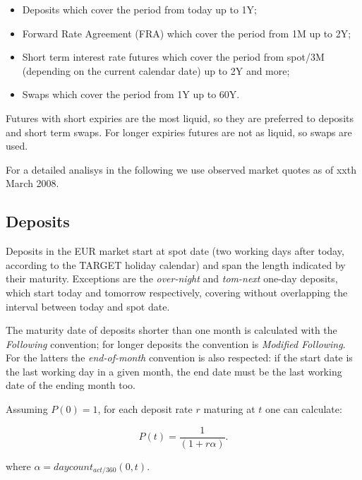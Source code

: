 \documentclass[11pt,reqno]{amsart}
\begin{document}
\begin{itemize}
\item Deposits which cover the period from today up to 1Y;

\item Forward Rate Agreement (FRA) which cover the period from 1M up to 2Y;

\item Short term interest rate futures which cover the period from spot/3M (depending on
the current calendar date) up to 2Y and more;

\item Swaps which cover the period from 1Y up to 60Y.
\end{itemize}

Futures with short expiries are the most liquid, so they are preferred to
deposits and short term swaps. For longer expiries futures are not as liquid, so
swaps are used.

For a detailed analisys in the following we use observed market quotes as of
xxth March 2008.

\subsection{Deposits}

Deposits in the EUR market start at spot date (two working days after today,
according to the TARGET holiday calendar) and span the length indicated by their maturity.
Exceptions are the {\it over-night} and {\it tom-next} one-day deposits, which start today and
tomorrow respectively, covering without overlapping the interval between today and spot date.

The maturity date of deposits shorter than one month is calculated with the
{\it Following} convention; for longer deposits the convention
is {\it Modified Following}. For the latters the {\it end-of-month} convention
is also respected: if the start date is the last working day in a given month,
the end date must be the last working date of the ending month too.

Assuming $P(0)=1$, for each deposit rate $r$ maturing at $t$ one can calculate:

\begin{equation}
P(t) = \frac{1}{(1 + r \alpha)}.
\label{eqn:deposit}
\end{equation}

where $\alpha = daycount_{act/360}(0,t)$.
\end{document}
